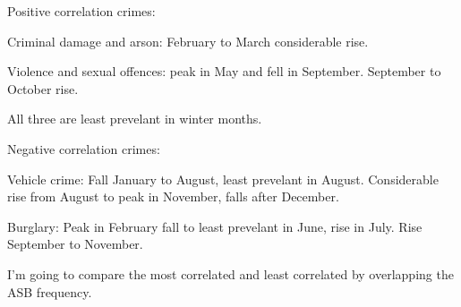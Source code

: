 \documentclass[11pt]{article}
\begin{document}
     Positive correlation crimes:

Criminal damage and arson: February to March considerable rise.

Violence and sexual offences: peak in May and fell in September.
September to October rise.

All three are least prevelant in winter months.

 Negative correlation crimes:

Vehicle crime: Fall January to August, least prevelant in August.
Considerable rise from August to peak in November, falls after December.

Burglary: Peak in February fall to least prevelant in June, rise in
July. Rise September to November.

I'm going to compare the most correlated and least correlated by
overlapping the ASB frequency.
\end{document}

